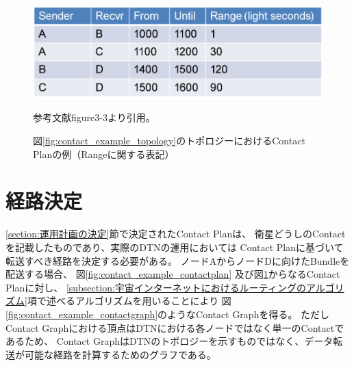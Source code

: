 \begin{figure}[tbh]
    \centering
    \includegraphics[width=0.5\textheight]{img/contact_example_contactrange.pdf}
    \caption{図\ref{fig:contact_example_topology}のトポロジーにおけるContact Planの例（Rangeに関する表記）}
    \label{fig:contact_example_contactrange}
    \begin{minipage}{\textwidth}
        \centering
        \vspace{3mm}
        参考文献\cite{schedule_aware_bundle_routing}figure3-3より引用。
    \end{minipage}
\end{figure}


\section{経路決定}
\label{subsection:経路決定}

\ref{section:運用計画の決定}節で決定されたContact Planは、
衛星どうしのContactを記載したものであり、実際のDTNの運用においては
Contact Planに基づいて転送すべき経路を決定する必要がある。
ノードAからノードDに向けたBundleを配送する場合、
図\ref{fig:contact_example_contactplan}
及び図\ref{fig:contact_example_contactrange}からなるContact Planに対し、
\ref{subsection:宇宙インターネットにおけるルーティングのアルゴリズム}項で述べるアルゴリズムを用いることにより
図\ref{fig:contact_example_contactgraph}のようなContact Graphを得る。
ただしContact Graphにおける頂点はDTNにおける各ノードではなく単一のContactであるため、
Contact GraphはDTNのトポロジーを示すものではなく、データ転送が可能な経路を計算するためのグラフである。

